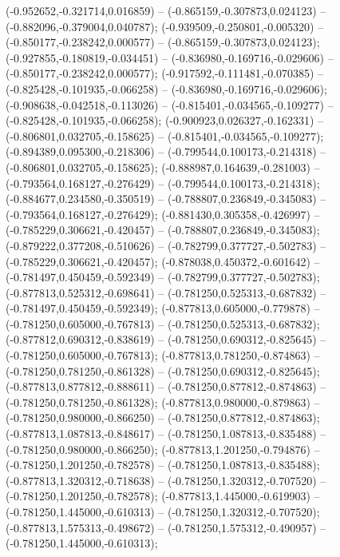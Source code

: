 (-0.952652,-0.321714,0.016859) -- (-0.865159,-0.307873,0.024123) -- (-0.882096,-0.379004,0.040787);
 (-0.939509,-0.250801,-0.005320) -- (-0.850177,-0.238242,0.000577) -- (-0.865159,-0.307873,0.024123);
 (-0.927855,-0.180819,-0.034451) -- (-0.836980,-0.169716,-0.029606) -- (-0.850177,-0.238242,0.000577);
 (-0.917592,-0.111481,-0.070385) -- (-0.825428,-0.101935,-0.066258) -- (-0.836980,-0.169716,-0.029606);
 (-0.908638,-0.042518,-0.113026) -- (-0.815401,-0.034565,-0.109277) -- (-0.825428,-0.101935,-0.066258);
 (-0.900923,0.026327,-0.162331) -- (-0.806801,0.032705,-0.158625) -- (-0.815401,-0.034565,-0.109277);
 (-0.894389,0.095300,-0.218306) -- (-0.799544,0.100173,-0.214318) -- (-0.806801,0.032705,-0.158625);
 (-0.888987,0.164639,-0.281003) -- (-0.793564,0.168127,-0.276429) -- (-0.799544,0.100173,-0.214318);
 (-0.884677,0.234580,-0.350519) -- (-0.788807,0.236849,-0.345083) -- (-0.793564,0.168127,-0.276429);
 (-0.881430,0.305358,-0.426997) -- (-0.785229,0.306621,-0.420457) -- (-0.788807,0.236849,-0.345083);
 (-0.879222,0.377208,-0.510626) -- (-0.782799,0.377727,-0.502783) -- (-0.785229,0.306621,-0.420457);
 (-0.878038,0.450372,-0.601642) -- (-0.781497,0.450459,-0.592349) -- (-0.782799,0.377727,-0.502783);
 (-0.877813,0.525312,-0.698641) -- (-0.781250,0.525313,-0.687832) -- (-0.781497,0.450459,-0.592349);
 (-0.877813,0.605000,-0.779878) -- (-0.781250,0.605000,-0.767813) -- (-0.781250,0.525313,-0.687832);
 (-0.877812,0.690312,-0.838619) -- (-0.781250,0.690312,-0.825645) -- (-0.781250,0.605000,-0.767813);
 (-0.877813,0.781250,-0.874863) -- (-0.781250,0.781250,-0.861328) -- (-0.781250,0.690312,-0.825645);
 (-0.877813,0.877812,-0.888611) -- (-0.781250,0.877812,-0.874863) -- (-0.781250,0.781250,-0.861328);
 (-0.877813,0.980000,-0.879863) -- (-0.781250,0.980000,-0.866250) -- (-0.781250,0.877812,-0.874863);
 (-0.877813,1.087813,-0.848617) -- (-0.781250,1.087813,-0.835488) -- (-0.781250,0.980000,-0.866250);
 (-0.877813,1.201250,-0.794876) -- (-0.781250,1.201250,-0.782578) -- (-0.781250,1.087813,-0.835488);
 (-0.877813,1.320312,-0.718638) -- (-0.781250,1.320312,-0.707520) -- (-0.781250,1.201250,-0.782578);
 (-0.877813,1.445000,-0.619903) -- (-0.781250,1.445000,-0.610313) -- (-0.781250,1.320312,-0.707520);
 (-0.877813,1.575313,-0.498672) -- (-0.781250,1.575312,-0.490957) -- (-0.781250,1.445000,-0.610313);
